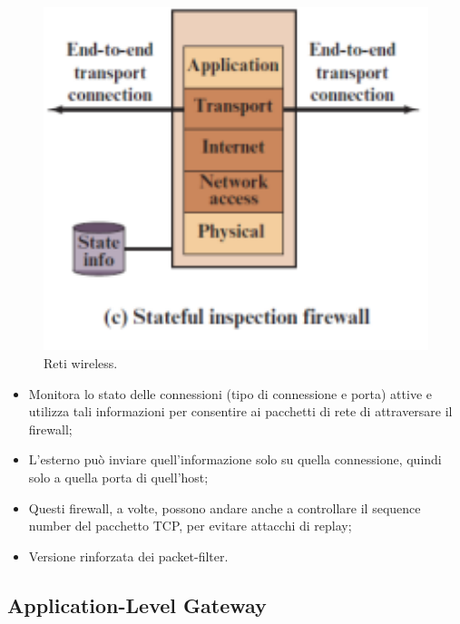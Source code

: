\begin{figure}[h]
    \centering
    \includegraphics[width=1\textwidth]{images/chapter7/7-2.png}
    \caption{Reti wireless.}
    \label{fig:7-2}
\end{figure}

\begin{itemize}
    \item Monitora lo stato delle connessioni (tipo di connessione e porta) attive e utilizza tali informazioni per consentire ai pacchetti di rete di attraversare il firewall;
	\item L'esterno può inviare quell'informazione solo su quella connessione, quindi solo a quella porta di quell'host;
	\item Questi firewall, a volte, possono andare anche a controllare il sequence number del pacchetto TCP, per evitare attacchi di replay;
    \item Versione rinforzata dei packet-filter.
\end{itemize}

\subsection{Application-Level Gateway}

